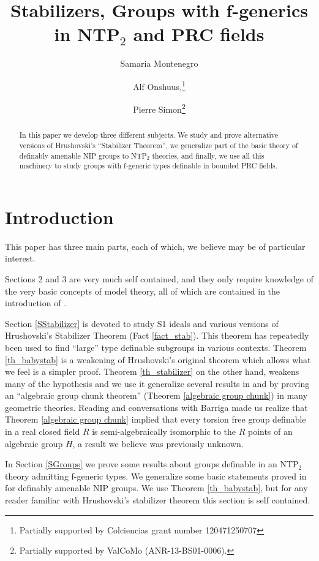 \documentclass[12pt]{article}
\title{Stabilizers, Groups with f-generics in NTP$_2$ and PRC fields}
\author{Samaria Montenegro\footnotemark[1] \and Alf Onshuus,\thanks{Partially supported by Colciencias grant number 120471250707}
 \and Pierre Simon\footnote{Partially supported by ValCoMo
(ANR-13-BS01-0006).}}
\date{}
\theoremstyle{definition}
\theoremstyle{mystyle}
\theoremstyle{remark}
\begin{document}
\maketitle

\begin{abstract}In this paper we develop three different subjects. We study and
prove alternative versions of Hrushovski's ``Stabilizer Theorem'',
we generalize part of the basic theory of definably amenable NIP
groups to NTP$_2$ theories, and finally, we use all this machinery
to study groups with f-generic types definable in bounded PRC
fields. \end{abstract}


\section{Introduction}


This paper has three main parts, each of which, we believe may be
of particular interest.

Sections 2 and 3 are very much self contained, and they only
require knowledge of the very basic concepts of model theory, all
of which are contained in the introduction of \cite{HrPi}.

Section \ref{SStabilizer} is devoted to study S1 ideals and
various versions of Hrushovski's Stabilizer Theorem (Fact
\ref{fact_stab}). This theorem has repeatedly been used to find
``large'' type definable subgroups in various contexts. Theorem
\ref{th_babystab} is a weakening of Hrushovski's original theorem
which allows what we feel is a simpler proof. Theorem
\ref{th_stabilizer} on the other hand, weakens many of the
hypothesis and we use it generalize several results in \cite{HrPi}
and \cite{Ba} by proving an ``algebraic group chunk theorem''
(Theorem \ref{algebraic group chunk}) in many geometric theories.
Reading \cite{Ba} and conversations with Barriga made us realize
that Theorem \ref{algebraic group chunk} implied that every
torsion free group definable in a real closed field $R$ is
semi-algebraically isomorphic to the $R$ points of an algebraic
group $H$, a result we believe was previously unknown.

In Section \ref{SGroups} we prove some results about groups
definable in an NTP$_2$ theory admitting f-generic types. We
generalize some basic statements proved in \cite{CS} for definably
amenable NIP groups. We use Theorem \ref{th_babystab}, but for any
reader familiar with Hrushovski's stabilizer theorem this section
is self contained.
\end{document}
